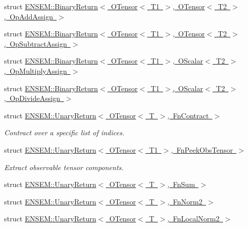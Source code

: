 \begin{DoxyCompactItemize}
\item 
struct \mbox{\hyperlink{structENSEM_1_1BinaryReturn_3_01OTensor_3_01T1_01_4_00_01OTensor_3_01T2_01_4_00_01OpAddAssign_01_4}{E\+N\+S\+E\+M\+::\+Binary\+Return$<$ O\+Tensor$<$ T1 $>$, O\+Tensor$<$ T2 $>$, Op\+Add\+Assign $>$}}
\item 
struct \mbox{\hyperlink{structENSEM_1_1BinaryReturn_3_01OTensor_3_01T1_01_4_00_01OTensor_3_01T2_01_4_00_01OpSubtractAssign_01_4}{E\+N\+S\+E\+M\+::\+Binary\+Return$<$ O\+Tensor$<$ T1 $>$, O\+Tensor$<$ T2 $>$, Op\+Subtract\+Assign $>$}}
\item 
struct \mbox{\hyperlink{structENSEM_1_1BinaryReturn_3_01OTensor_3_01T1_01_4_00_01OScalar_3_01T2_01_4_00_01OpMultiplyAssign_01_4}{E\+N\+S\+E\+M\+::\+Binary\+Return$<$ O\+Tensor$<$ T1 $>$, O\+Scalar$<$ T2 $>$, Op\+Multiply\+Assign $>$}}
\item 
struct \mbox{\hyperlink{structENSEM_1_1BinaryReturn_3_01OTensor_3_01T1_01_4_00_01OScalar_3_01T2_01_4_00_01OpDivideAssign_01_4}{E\+N\+S\+E\+M\+::\+Binary\+Return$<$ O\+Tensor$<$ T1 $>$, O\+Scalar$<$ T2 $>$, Op\+Divide\+Assign $>$}}
\item 
struct \mbox{\hyperlink{structENSEM_1_1UnaryReturn_3_01OTensor_3_01T_01_4_00_01FnContract_01_4}{E\+N\+S\+E\+M\+::\+Unary\+Return$<$ O\+Tensor$<$ T $>$, Fn\+Contract $>$}}
\begin{DoxyCompactList}\small\item\em Contract over a specific list of indices. \end{DoxyCompactList}\item 
struct \mbox{\hyperlink{structENSEM_1_1UnaryReturn_3_01OTensor_3_01T1_01_4_00_01FnPeekObsTensor_01_4}{E\+N\+S\+E\+M\+::\+Unary\+Return$<$ O\+Tensor$<$ T1 $>$, Fn\+Peek\+Obs\+Tensor $>$}}
\begin{DoxyCompactList}\small\item\em Extract observable tensor components. \end{DoxyCompactList}\item 
struct \mbox{\hyperlink{structENSEM_1_1UnaryReturn_3_01OTensor_3_01T_01_4_00_01FnSum_01_4}{E\+N\+S\+E\+M\+::\+Unary\+Return$<$ O\+Tensor$<$ T $>$, Fn\+Sum $>$}}
\item 
struct \mbox{\hyperlink{structENSEM_1_1UnaryReturn_3_01OTensor_3_01T_01_4_00_01FnNorm2_01_4}{E\+N\+S\+E\+M\+::\+Unary\+Return$<$ O\+Tensor$<$ T $>$, Fn\+Norm2 $>$}}
\item 
struct \mbox{\hyperlink{structENSEM_1_1UnaryReturn_3_01OTensor_3_01T_01_4_00_01FnLocalNorm2_01_4}{E\+N\+S\+E\+M\+::\+Unary\+Return$<$ O\+Tensor$<$ T $>$, Fn\+Local\+Norm2 $>$}}

\end{DoxyCompactItemize}
